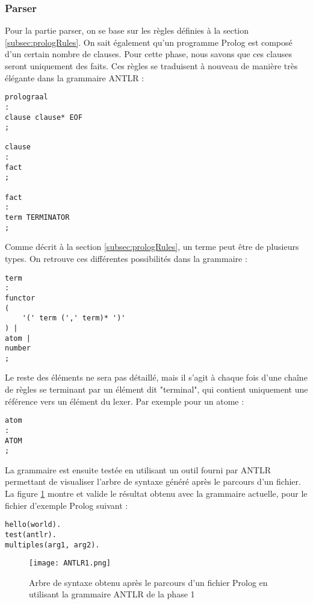 \documentclass[../report.tex]{subfiles}
\begin{document}
\subsubsection{Parser}
Pour la partie parser, on se base sur les règles définies à la section \ref{subsec:prologRules}. On sait également qu'un programme Prolog est composé d'un certain nombre de clauses. Pour cette phase, nous savons que ces clauses seront uniquement des faits. Ces règles se traduisent à nouveau de manière très élégante dans la grammaire ANTLR :
\begin{verbatim}
prolograal
:
clause clause* EOF
;

clause
:
fact
;

fact
:
term TERMINATOR
;
\end{verbatim}
Comme décrit à la section \ref{subsec:prologRules}, un terme peut être de plusieurs types. On retrouve ces différentes possibilités dans la grammaire :
\begin{verbatim}
term
:
functor 
(
    '(' term (',' term)* ')'
) |
atom | 
number
;    
\end{verbatim}
Le reste des éléments ne sera pas détaillé, mais il s'agit à chaque fois d'une chaîne de règles se terminant par un élément dit "terminal", qui contient uniquement une référence vers un élément du lexer. Par exemple pour un atome :
\begin{verbatim}
atom
:
ATOM
;    
\end{verbatim}
La grammaire est ensuite testée en utilisant un outil fourni par ANTLR permettant de visualiser l'arbre de syntaxe généré après le parcours d'un fichier. La figure \ref{fig:antlr1} montre et valide le résultat obtenu avec la grammaire actuelle, pour le fichier d'exemple Prolog suivant :
\begin{verbatim}
hello(world).
test(antlr).
multiples(arg1, arg2).
\end{verbatim}
\begin{figure}[h]
    \centering
    \texttt{[image: ANTLR1.png]}
    \caption{Arbre de syntaxe obtenu après le parcours d'un fichier Prolog en utilisant la grammaire ANTLR de la phase 1}
    \label{fig:antlr1}
\end{figure}
\end{document}

